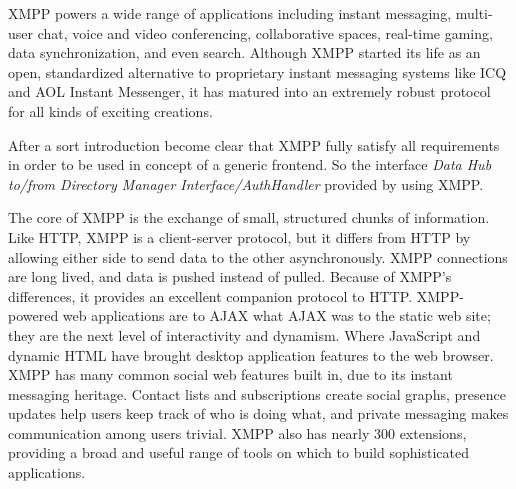       XMPP powers a wide range of applications including instant messaging, multi-user chat, voice and video conferencing, collaborative spaces, real-time gaming, data synchronization, and even search. Although XMPP started its life as an open, standardized alternative to proprietary instant messaging systems like ICQ and AOL Instant Messenger, it has matured into an extremely robust protocol for all kinds of exciting creations.

      After a sort introduction become clear that XMPP fully satisfy all requirements in order to be used in concept of a generic frontend. So the interface \emph{Data Hub to/from Directory Manager Interface/AuthHandler} provided by using XMPP.
   
      The core of XMPP is the exchange of small, structured chunks of information. Like HTTP, XMPP is a client-server protocol, but it differs from HTTP by allowing either side to send data to the other asynchronously. XMPP connections are long lived, and data is pushed instead of pulled. Because of XMPP’s differences, it provides an excellent companion protocol to HTTP. XMPP-powered web applications are to AJAX what AJAX was to the static web site; they are the next level of interactivity and dynamism. Where JavaScript and dynamic HTML have brought desktop application features to the web browser. XMPP has many common social web features built in, due to its instant messaging heritage. Contact lists and subscriptions create social graphs, presence updates help users keep track of who is doing what, and private messaging makes communication among users trivial. XMPP also has nearly 300 extensions, providing a broad and useful range of tools on which to build sophisticated applications. 
   
